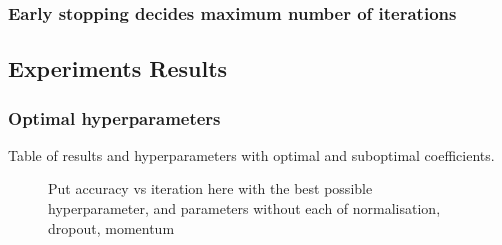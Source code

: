 \subsubsection{Early stopping decides maximum number of iterations}

\subsection{Experiments Results}
\subsubsection{Optimal hyperparameters}

Table of results and hyperparameters with optimal and suboptimal coefficients.

\begin{figure}
	\centering
\caption{Put accuracy vs iteration here with the best possible hyperparameter, and parameters without each of normalisation, dropout, momentum}\label{noisesklnmff}
\end{figure}


\begin{table}
\caption{Results and parameters of the best four setups.}
{
\centering
{}}
\end{table}

\begin{table}
\caption{Results and parameters of different setups for 89.87 results.}
{
\centering
{}}
\end{table}

